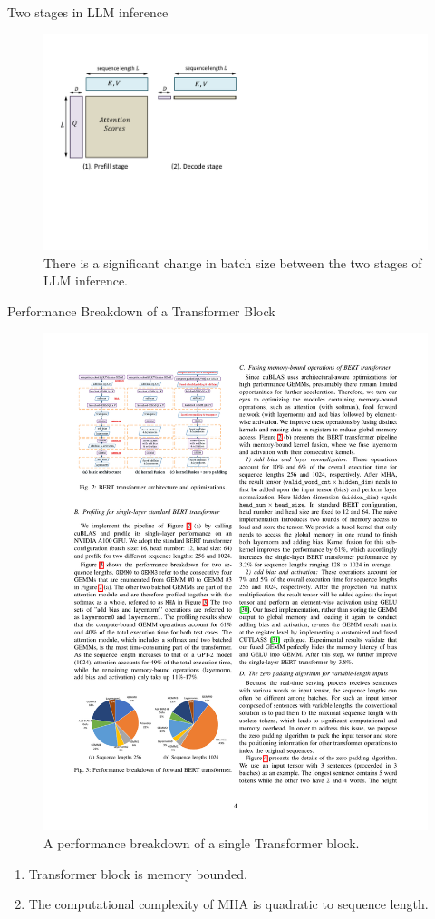 \begin{frame}{Two stages in LLM inference}
    \begin{figure}
        \includegraphics[width=0.7\linewidth]{./images/two-stages-in-llm-inference.pdf}
        \caption{There is a significant change in batch size between the two stages of LLM inference.}
    \end{figure}
\end{frame}

\begin{frame}{Performance Breakdown of a Transformer Block}
    \begin{figure}
        \includegraphics[width=0.7\linewidth]{./images/BERT-performance-breakdown.pdf}
        \caption{A performance breakdown of a single Transformer block.}
    \end{figure}

    \footnotesize{
    \begin{enumerate}
        \item Transformer block is memory bounded.
        \item The computational complexity of MHA is quadratic to sequence length.
    \end{enumerate}
    }
\end{frame}

